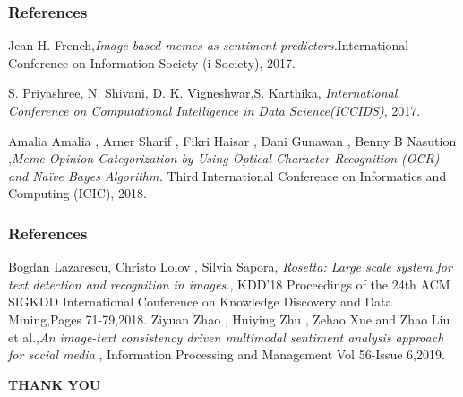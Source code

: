 \documentclass[]{beamer}
\begin{document}
\begin{frame}\frametitle{References}
\begin{thebibliography}{99}
    
	Jean H. French,{\em Image-based memes as sentiment predictors.}International Conference on Information Society (i-Society), 2017.
	
	S. Priyashree, N. Shivani, D. K. Vigneshwar,S. Karthika, {\em International Conference on Computational Intelligence in Data Science(ICCIDS)}, 2017.
	
	Amalia Amalia , Arner Sharif , Fikri Haisar , Dani Gunawan , Benny B Nasution ,{\em Meme Opinion Categorization by Using Optical Character Recognition (OCR) and Na\"ive Bayes Algorithm.} Third International Conference on Informatics and Computing (ICIC), 2018.
\end{thebibliography}
\end{frame}
	
\begin{frame}\frametitle{References}
	\begin{thebibliography}{99}	
	 Bogdan Lazarescu, Christo Lolov , Silvia Sapora, {\em Rosetta: Large scale system for text detection and recognition in images.}, 
	KDD'18 Proceedings of the 24th ACM SIGKDD International Conference on Knowledge Discovery and Data Mining,Pages 71-79,2018.
	Ziyuan Zhao , Huiying Zhu , Zehao Xue and Zhao Liu  et al.,{\em An image-text consistency driven multimodal sentiment analysis approach for social media} , Information Processing and Management Vol 56-Issue 6,2019.
\end{thebibliography}
\end{frame}

\begin{frame}
    \begin{LARGE}
    \begin{Huge}
    \begin{center}
        \textbf{THANK YOU}
    \end{center}  
    \end{Huge}  
    \end{LARGE}
  
  
\end{frame}
\end{document}
